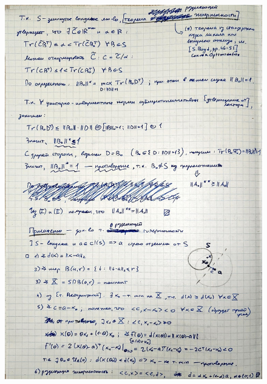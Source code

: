 \documentclass{article}
\begin{document}
	\begin{figure}[h!]
		\includegraphics[width=0.95\linewidth]{handwritten/matcomp_hw1_bonus_1b}
	\end{figure}
	
\end{document}
